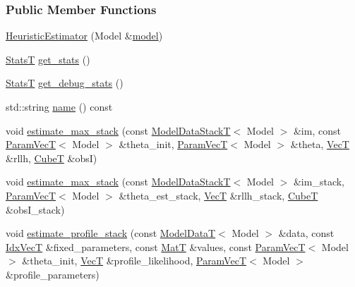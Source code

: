 \subsubsection*{Public Member Functions}
\begin{DoxyCompactItemize}
\item 
\hyperlink{classmappel_1_1HeuristicEstimator_a51e2263b42adf83c66a5b8d2348a6bd6}{Heuristic\+Estimator} (Model \&\hyperlink{classmappel_1_1Estimator_a8322546d87ccdf01f8b0dcd9dae509f0}{model})
\item 
\hyperlink{namespacemappel_a04ab395b0cf82c4ce68a36b2212649a5}{StatsT} \hyperlink{classmappel_1_1HeuristicEstimator_a4417718491c7d3d8f78bd3ba5518307b}{get\+\_\+stats} ()
\item 
\hyperlink{namespacemappel_a04ab395b0cf82c4ce68a36b2212649a5}{StatsT} \hyperlink{classmappel_1_1HeuristicEstimator_a6926009475af3b1dae9043d32cfa6d88}{get\+\_\+debug\+\_\+stats} ()
\item 
std\+::string \hyperlink{classmappel_1_1HeuristicEstimator_a6c9efb24639627b3f3b3eb151e02d43b}{name} () const 
\item 
void \hyperlink{classmappel_1_1ThreadedEstimator_afb7a2e27b4e8dcc2fa604f83344461fe}{estimate\+\_\+max\+\_\+stack} (const \hyperlink{namespacemappel_aaeb6665bc57476dd93c2df6ad8bc4768}{Model\+Data\+StackT}$<$ Model $>$ \&im, const \hyperlink{namespacemappel_a0f86d3153e4e27b095012f140eea58de}{Param\+VecT}$<$ Model $>$ \&theta\+\_\+init, \hyperlink{namespacemappel_a0f86d3153e4e27b095012f140eea58de}{Param\+VecT}$<$ Model $>$ \&theta, \hyperlink{namespacemappel_a2225ad69f358daa3f4f99282a35b9a3a}{VecT} \&rllh, \hyperlink{namespacemappel_ab2afab4e6c8805e83946670d882768c2}{CubeT} \&obsI)
\item 
void \hyperlink{classmappel_1_1Estimator_aa1b1c2677df2c6ea9fcf67b6a0856e46}{estimate\+\_\+max\+\_\+stack} (const \hyperlink{namespacemappel_aaeb6665bc57476dd93c2df6ad8bc4768}{Model\+Data\+StackT}$<$ Model $>$ \&im\+\_\+stack, \hyperlink{namespacemappel_a0f86d3153e4e27b095012f140eea58de}{Param\+VecT}$<$ Model $>$ \&theta\+\_\+est\+\_\+stack, \hyperlink{namespacemappel_a2225ad69f358daa3f4f99282a35b9a3a}{VecT} \&rllh\+\_\+stack, \hyperlink{namespacemappel_ab2afab4e6c8805e83946670d882768c2}{CubeT} \&obs\+I\+\_\+stack)
\item 
void \hyperlink{classmappel_1_1ThreadedEstimator_aebbf686f95be1331ff85cecd5a3c97db}{estimate\+\_\+profile\+\_\+stack} (const \hyperlink{namespacemappel_a97f050df953605381ae9c901c3b125f1}{Model\+DataT}$<$ Model $>$ \&data, const \hyperlink{namespacemappel_ac63743dcd42180127307cd0e4ecdd784}{Idx\+VecT} \&fixed\+\_\+parameters, const \hyperlink{namespacemappel_a7091ab87c528041f7e2027195fad8915}{MatT} \&values, const \hyperlink{namespacemappel_a0f86d3153e4e27b095012f140eea58de}{Param\+VecT}$<$ Model $>$ \&theta\+\_\+init, \hyperlink{namespacemappel_a2225ad69f358daa3f4f99282a35b9a3a}{VecT} \&profile\+\_\+likelihood, \hyperlink{namespacemappel_a0f86d3153e4e27b095012f140eea58de}{Param\+VecT}$<$ Model $>$ \&profile\+\_\+parameters)

\end{DoxyCompactItemize}
